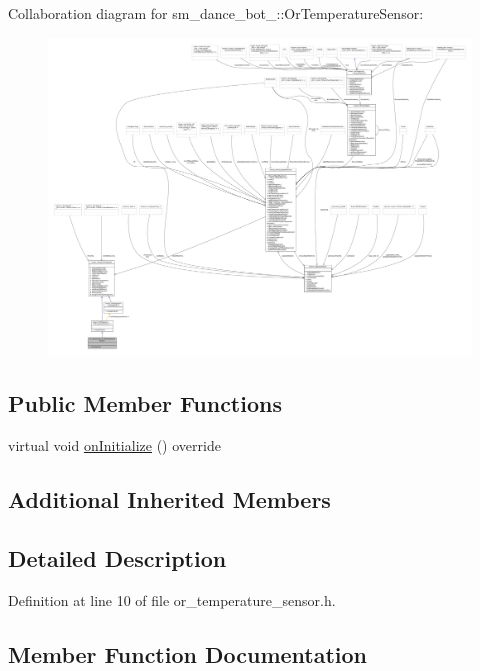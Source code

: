 Collaboration diagram for sm\+\_\+dance\+\_\+bot\+\_\+:\+:Or\+Temperature\+Sensor\+:
\nopagebreak
\begin{figure}[H]
\begin{center}
\leavevmode
\includegraphics[width=350pt]{classsm__dance__bot__2_1_1OrTemperatureSensor__coll__graph}
\end{center}
\end{figure}
\subsection*{Public Member Functions}
\begin{DoxyCompactItemize}
\item 
virtual void \hyperlink{classsm__dance__bot__2_1_1OrTemperatureSensor_a8ffbdea008961e707101f496c6b91f50}{on\+Initialize} () override
\end{DoxyCompactItemize}
\subsection*{Additional Inherited Members}


\subsection{Detailed Description}


Definition at line 10 of file or\+\_\+temperature\+\_\+sensor.\+h.



\subsection{Member Function Documentation}
\mbox{\label{classsm__dance__bot__2_1_1OrTemperatureSensor_a8ffbdea008961e707101f496c6b91f50}} 
